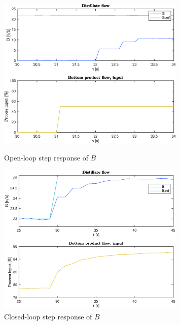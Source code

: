 \documentclass[12pt]{article}
\begin{document}
\begin{figure}[p]
\centering
\includegraphics[width=0.8\textwidth]{../Systemanalyse/Log_Data_to_Matlab/Figurer/Stegeksperimenter/FC1019.eps}
\caption{Open-loop step response of $B$}
\label{fig:ol_step_FC1019}

\includegraphics[width=0.8\textwidth]{../Systemanalyse/Log_Data_to_Matlab/Figurer/Stegeksperimenter/FC1019_step.eps}
\caption{Closed-loop step response of $B$}
\label{fig:cl_step_FC1019}
\end{figure}
\end{document}
